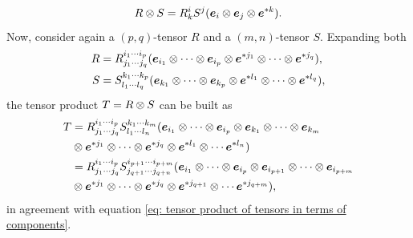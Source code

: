 \begin{equation}
    R \otimes S = R^i_kS^j(\bm{e}_i \otimes \bm{e}_j \otimes \bm{e}^{*k}).
\end{equation}
Now, consider again a $(p,q)$-tensor $R$ and a $(m,n)$-tensor $S$. Expanding both
\begin{align}
    R &= R^{i_1\cdots i_p}_{j_1\cdots j_q}(\bm{e}_{i_1} \otimes \cdots \otimes \bm{e}_{i_p} \otimes \bm{e}^{*j_1} \otimes \cdots \otimes \bm{e}^{*j_q}), \\
    S &= S^{k_1\cdots k_p}_{l_1\cdots l_q}(\bm{e}_{k_1} \otimes \cdots \otimes \bm{e}_{k_p} \otimes \bm{e}^{*l_1} \otimes \cdots \otimes \bm{e}^{*l_q}),
\end{align}
the tensor product $T = R \otimes S$ can be built as
\begin{equation}
    \begin{split}
        T &= R^{i_1\cdots i_p}_{j_1\cdots j_q}S^{k_1\cdots k_m}_{l_1\cdots l_n}(\bm{e}_{i_1} \otimes \cdots \otimes \bm{e}_{i_p} \otimes \bm{e}_{k_1} \otimes \cdots \otimes \bm{e}_{k_m} \\
        &\otimes \bm{e}^{*j_1} \otimes \cdots \otimes \bm{e}^{*j_q} \otimes \bm{e}^{*l_1} \otimes \cdots \bm{e}^{*l_n}) \\
        &= R^{i_1\cdots i_p}_{j_1\cdots j_q}S^{i_{p + 1}\cdots i_{p + m}}_{j_{q + 1}\cdots j_{q + n}}(\bm{e}_{i_1} \otimes \cdots \otimes \bm{e}_{i_p} \otimes \bm{e}_{i_{p + 1}} \otimes \cdots \otimes \bm{e}_{i_{p + m}} \\
        &\otimes \bm{e}^{*j_1} \otimes \cdots \otimes \bm{e}^{*j_q} \otimes \bm{e}^{*j_{q + 1}} \otimes \cdots \bm{e}^{*j_{q + m}}),
    \end{split}
\end{equation}
in agreement with equation \eqref{eq: tensor product of tensors in terms of components}.

